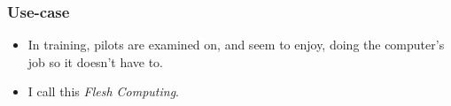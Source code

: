 \begin{frame}[fragile]
\frametitle{Use-case}
\begin{block}{}
\begin{itemize}
\item<1-> In training, pilots are examined on, and seem to enjoy, doing the computer's job so it doesn't have to.
\item<2-> I call this \emph{Flesh Computing}.
\end{itemize}
\end{block}
\end{frame}

